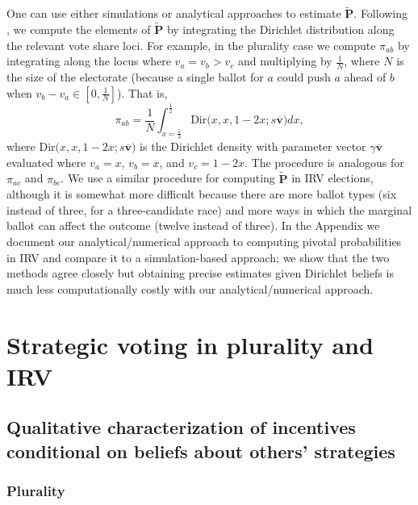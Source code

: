 \documentclass[11pt,a4paper]{article}
\begin{document}
One can use either simulations or analytical approaches to estimate $\tilde{\mathbf{P}}$. Following \citet{fisher2017strategic}, we compute the elements of $\tilde{\mathbf{P}}$ by integrating the Dirichlet distribution along the relevant vote share loci. For example, in the plurality case we compute $\pi_{ab}$ by integrating along the locus where $v_a = v_b > v_c$ and multiplying by $\frac{1}{N}$, where $N$ is the size of the electorate (because a single ballot for $a$ could push $a$ ahead of $b$ when $v_b - v_a \in \left[0, \frac{1}{N}\right]$). That is, 
\[ 
\pi_{ab} = \frac{1}{N} \int_{x = \frac{1}{3}}^{\frac{1}{2}} \mathrm{Dir}\big(x, x, 1 - 2x; s \overline{\mathbf{v}}\big) dx,
\]
where $\mathrm{Dir}\big(x, x, 1 - 2x; s \overline{\mathbf{v}}\big)$ is the Dirichlet density with parameter vector $\gamma \overline{\mathbf{v}}$ evaluated where $v_a = x$, $v_b = x$, and $v_c = 1- 2x$. The procedure is analogous for $\pi_{ac}$ and $\pi_{bc}$. We use a similar procedure for computing $\tilde{\mathbf{P}}$ in IRV elections, although it is somewhat more difficult because there are more ballot types (six instead of three, for a three-candidate race) and more ways in which the marginal ballot can affect the outcome (twelve instead of three). In the Appendix we document our analytical/numerical approach to computing pivotal probabilities in IRV and compare it to a simulation-based approach; we show that the two methods agree closely but obtaining precise estimates given Dirichlet beliefs is much less computationally costly with our analytical/numerical approach.  



\section{Strategic voting in plurality and IRV}

\subsection{Qualitative characterization of incentives conditional on beliefs about others' strategies} 

\subsubsection{Plurality} 
\end{document}
